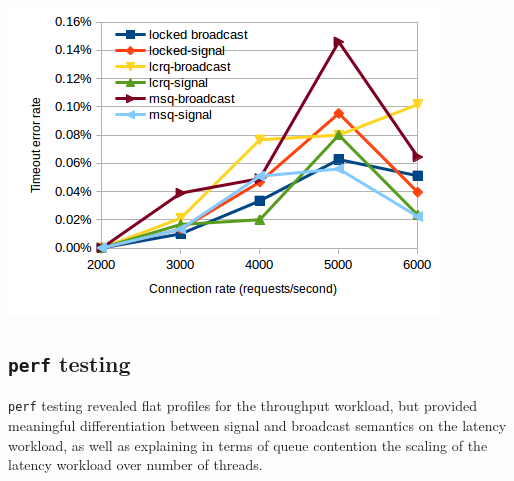 \documentclass[twoside,10pt]{article}
\newenvironment{Figure}
  {\par\medskip\noindent\minipage{\linewidth}}
  {\endminipage\par\medskip}
\begin{document}
\begin{multicols}{2}
\begin{Figure}
\includegraphics[width=\linewidth]{img/throughputmedian.png}
\end{Figure}

\subsection{\texttt{perf} testing}

\verb+perf+ testing revealed flat profiles for the throughput
workload, but provided meaningful differentiation between signal and
broadcast semantics on the latency workload, as well as explaining in
terms of queue contention the scaling of the latency workload over
number of threads.



\end{multicols}
\end{document}
